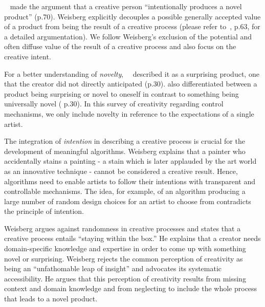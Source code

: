 
\citeauthor*{weisberg_2006_cui}~\cite{weisberg_2006_cui} made the argument that a creative person ``intentionally produces a novel product'' (p.70). Weisberg explicitly decouples a possible generally accepted value of a product from being the result of a creative process (please refer to~\cite{weisberg_2006_cui}, p.63, for a detailed argumentation). We follow Weisberg's exclusion of the potential and often diffuse value of the result of a creative process and also focus on the creative intent. 

For a better understanding of \textit{novelty},~\citeauthor*{boden_2010_cat}~\cite{boden_2010_cat} described it as a surprising product, one that the creator did not directly anticipated (p.30). \citeauthor*{boden_2010_cat} also differentiated between a product being surprising or novel to oneself in contrast to something being universally novel (\cite{boden_2010_cat} p.30). In this survey of creativity regarding control mechanisms, we only include novelty in reference to the expectations of a single artist.

The integration of \textit{intention} in describing a creative process is crucial for the development of meaningful algorithms. Weisberg explains that a painter who accidentally stains a painting - a stain which is later applauded by the art world as an innovative technique - cannot be considered a creative result. Hence, algorithms need to enable artists to follow their intentions with transparent and controllable mechanisms. The idea, for example, of an algorithm producing a large number of random design choices for an artist to choose from contradicts the principle of intention.

Weisberg argues against randomness in creative processes and states that a creative process entails ``staying within the box.'' He explains that a creator needs domain-specific knowledge and expertise in order to come up with something novel or surprising. 
Weisberg rejects the common perception of creativity as being an ``unfathomable leap of insight'' and advocates its systematic accessibility. He argues that this perception of creativity results from missing context and domain knowledge and from neglecting to include the whole process that leads to a novel product.

